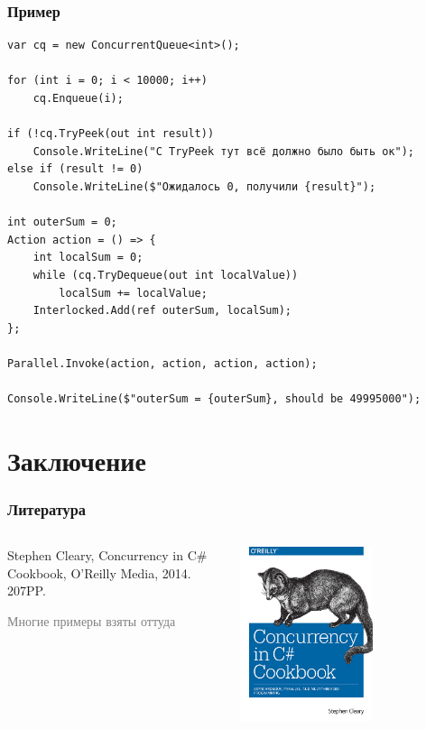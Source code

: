 \documentclass[xetex,mathserif,serif]{beamer}
\begin{document}
	\begin{frame}[fragile]
		\frametitle{Пример}
		\begin{scriptsize}
			\begin{verbatim}
var cq = new ConcurrentQueue<int>();

for (int i = 0; i < 10000; i++) 
    cq.Enqueue(i);

if (!cq.TryPeek(out int result))
    Console.WriteLine("С TryPeek тут всё должно было быть ок");
else if (result != 0)
    Console.WriteLine($"Ожидалось 0, получили {result}");

int outerSum = 0;
Action action = () => {
    int localSum = 0;
    while (cq.TryDequeue(out int localValue)) 
        localSum += localValue;
    Interlocked.Add(ref outerSum, localSum);
};

Parallel.Invoke(action, action, action, action);

Console.WriteLine($"outerSum = {outerSum}, should be 49995000");
			\end{verbatim}
		\end{scriptsize}
	\end{frame}

	\section{Заключение}

	\begin{frame}
		\frametitle{Литература}
		\begin{columns}
			\begin{column}{0.6\textwidth}
				Stephen Cleary, Concurrency in C\# Cookbook, O'Reilly Media, 2014. 207PP.

				\textcolor{gray}{Многие примеры взяты оттуда}
			\end{column}
			\begin{column}{0.4\textwidth}
				\begin{center}
					\includegraphics[width=0.6\textwidth]{concurrencyCookbookCover.png}
				\end{center}
			\end{column}
		\end{columns}
	\end{frame}
\end{document}
